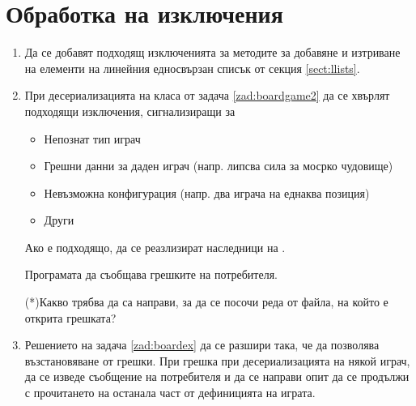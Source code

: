 \section{Обработка на изключения}
\begin{enumerate}

  \item Да се добавят подходящ изключенията за методите за добавяне и изтриване на елементи на линейния едносвързан списък от секция \ref{sect:llists}.

  \item \label{zad:boardex}При десериализацията на класа  от задача \ref{zad:boardgame2} да се хвърлят подходящи изключения, сигнализиращи за 
  
  \begin{itemize}
    \item Непознат тип играч
    \item Грешни данни за даден играч (напр. липсва сила за мосрко чудовище)
    \item Невъзможна конфигурация (напр. два играча на еднаква позиция)
    \item Други
  \end{itemize}

  Ако е подходящо, да се реазлизират наследници на . 
  
  Програмата да съобщава грешките на потребителя.

  (*)Какво трябва да са направи, за да се посочи реда от файла, на който е открита грешката?

  \item Решението на задача \ref{zad:boardex} да се разшири така, че да позволява възстановяване от грешки. При грешка при десериализацията на някой играч, да се изведе съобщение на потребителя и да се направи опит да се продължи с прочитането на останала част от дефиницията на играта.
  

\end{enumerate}

